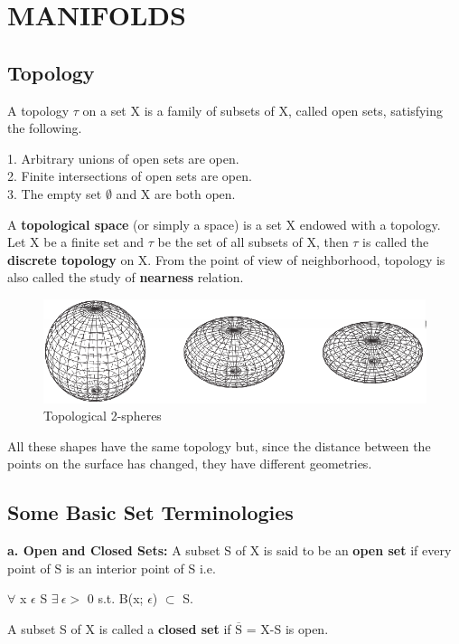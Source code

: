 \section{MANIFOLDS}
\subsection{Topology}
A topology $\tau$ on a set X is a family of subsets of X, called
open sets, satisfying the following.

1. Arbitrary unions of open sets are open. \\
2. Finite intersections of open sets are open. \\
3. The empty set $\emptyset$ and X are both open.

A \textbf{topological space} (or simply a space) is a set X endowed with a topology.
Let X be a finite set and $\tau$ be the set of all subsets of X, then $\tau$ is called the \textbf{discrete topology} on X.
From the point of view of neighborhood, topology is also called the study of \textbf{nearness} relation.
\begin{figure}[ht]
    \begin{center}
        \includegraphics[width=\textwidth]{figures/topology_sphere.png}
        \caption{Topological 2-spheres}
    \end{center}
\end{figure}

All these shapes have the same topology but, since
the distance between the points on the surface has changed, they have different
geometries.

\subsection{Some Basic Set Terminologies}
\textbf{a. Open and Closed Sets:} A subset S of X is said to be an \textbf{open set} if every point of S is an interior point of S i.e.
\begin{center}
    $\forall$ x $\epsilon$ S $\exists \: \epsilon >$ 0 s.t. B(x; $\epsilon$) $\subset$ S.    
\end{center}
A subset S of X is called a \textbf{closed set} if $\overline{\text{S}}$ = X-S is open.


